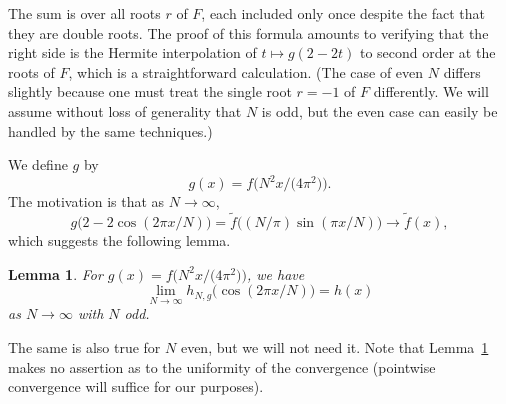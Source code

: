\documentclass{jams-l}
\theoremstyle{plain}
\newtheorem{lemma}[theorem]{Lemma}
\numberwithin{theorem}{section}
\theoremstyle{definition}
\numberwithin{equation}{section}
\newcommand{\ft}{\widetilde{f}}
\begin{document}
The sum is over all roots $r$ of $F$, each included only once
despite the fact that they are double roots. The proof of this
formula amounts to verifying that the right side is the Hermite
interpolation of $t \mapsto g(2-2t)$ to second order at the roots
of $F$, which is a straightforward calculation. (The case of even
$N$ differs slightly because one must treat the single root $r=-1$
of $F$ differently.  We will assume without loss of generality
that $N$ is odd, but the even case can easily be handled by the
same techniques.)

We define $g$ by
$$
g(x) = f\big(N^2 x/\big(4\pi^2\big)\big) .
$$
The motivation is that as $N \to \infty$,
$$
g\big(2 - 2\cos (2\pi x/N)\big) = \ft\big((N/\pi) \sin (\pi x /N)
\big) \to \ft(x),
$$
which suggests the \pagebreak following lemma.

\begin{lemma} \label{lemma:converge}
For $g(x) = f\big(N^2 x/\big(4\pi^2\big)\big)$, we have
$$
\lim_{N \to \infty} h_{N,g}\big(\cos (2\pi x/N)\big) = h(x)
$$
as $N \to \infty$ with $N$ odd.
\end{lemma}

The same is also true for $N$ even, but we will not need it. Note
that Lemma~\ref{lemma:converge} makes no assertion as to the
uniformity of the convergence (pointwise convergence will suffice
for our purposes).
\end{document}
